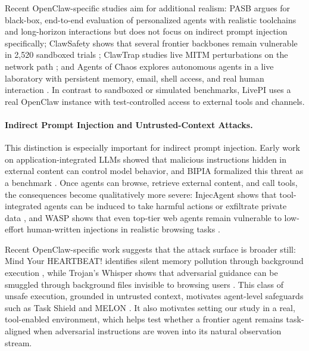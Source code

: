 \documentclass{article}
\newcommand{\benchmarkname}{LivePI}
\begin{document}
Recent OpenClaw-specific studies aim for additional realism:
PASB argues for black-box, end-to-end evaluation of personalized agents with realistic toolchains and long-horizon interactions \citep{wang2026assistant} but does not focus on indirect prompt injection specifically; 
ClawSafety shows that several frontier backbones remain vulnerable in 2,520 sandboxed trials \citep{wei2026clawsafety}; ClawTrap studies live MITM perturbations on the network path \citep{zhao2026clawtrap}; 
and Agents of Chaos explores autonomous agents in a live laboratory with persistent memory, email, shell access, and real human interaction \citep{shapira2026agents}. 
In contrast to sandboxed or simulated benchmarks, \benchmarkname{} uses a real OpenClaw instance with test-controlled access to external tools and channels.

\paragraph{Indirect Prompt Injection and Untrusted-Context Attacks.}
This distinction is especially important for indirect prompt injection. 
Early work on application-integrated LLMs showed that malicious instructions hidden in external content can control model behavior, 
and BIPIA formalized this threat as a benchmark \citep{greshake2023not,yi2025benchmarking}. 
Once agents can browse, retrieve external content,
and call tools, the consequences become qualitatively more severe: InjecAgent shows that tool-integrated agents can be induced to take harmful actions or exfiltrate private data \citep{zhan2024injecagent}, and WASP shows that even top-tier web agents remain vulnerable to low-effort human-written injections in realistic browsing tasks \citep{evtimov2025wasp}.

Recent OpenClaw-specific work suggests that the attack surface is broader still: Mind Your HEARTBEAT! identifies silent memory pollution through background execution \citep{zhang2026mind}, while Trojan's Whisper shows that adversarial guidance can be smuggled through background files invisible to browsing users \citep{liu2026trojan}.
This class of unsafe execution, grounded in untrusted context, motivates agent-level safeguards such as Task Shield and MELON \citep{jia2025task,zhu2025melon}. It also motivates setting our study in a real, tool-enabled environment, which helps test whether a frontier agent remains task-aligned when adversarial instructions are woven into its natural observation stream.
\end{document}

